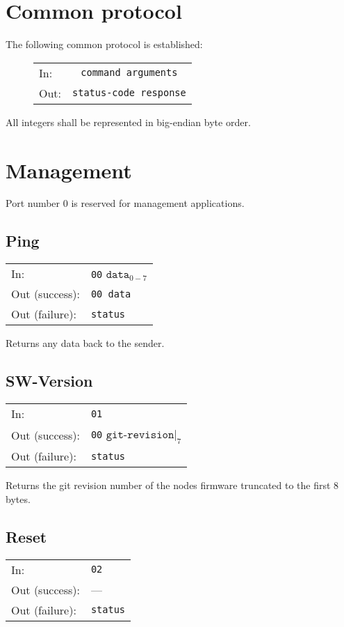 \documentclass[a4paper]{scrartcl}
\begin{document}
\section{Common protocol}
The following common protocol is established:

\begin{figure}[h]
  \centering
  \begin{tabular}{lc}
    In: & \texttt{command arguments} \\
    Out: & \texttt{status-code response}
  \end{tabular}
\end{figure}

All integers shall be represented in big-endian byte order.

\section{Management}
Port number 0 is reserved for management applications.

\subsection{Ping}
\begin{tabular}{ll}
  In: & \texttt{00} $\texttt{data}_{0-7}$ \\
  Out (success): & \texttt{00 data} \\
  Out (failure): & \texttt{status}
\end{tabular}
\vspace{5pt}

Returns any data back to the sender.

\subsection{SW-Version}
\begin{tabular}{ll}
  In: & \texttt{01} \\
  Out (success): & \texttt{00} ${\texttt{git-revision}|}_7$ \\
  Out (failure): & \texttt{status}
\end{tabular}
\vspace{5pt}

Returns the git revision number of the nodes firmware truncated to the
first 8 bytes.

\subsection{Reset}
\begin{tabular}{ll}
  In: & \texttt{02} \\
  Out (success): & --- \\
  Out (failure): & \texttt{status}
\end{tabular}
\vspace{5pt}
\end{document}
